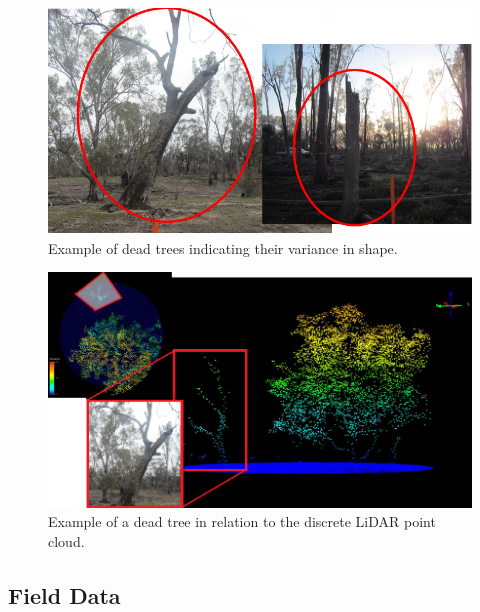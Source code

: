 \documentclass{subfiles}
\begin{document}
	\begin{figure} [h!]
		\centering
		\includegraphics[width=\textwidth]{img/DeadTreesExamplePhotos}
		\caption{Example of dead trees indicating their variance in shape.}
		\label{fig:DeadTreesExamplePhotos}
	\end{figure}

 \begin{figure} [h!]
 	\centering
 	\includegraphics[width=\textwidth]{img/DeadTreeInLiDAR}
 	\caption{Example of a dead tree in relation to the discrete LiDAR point cloud.}
 	\label{fig:DeadTreeInLiDAR}
 \end{figure}



\subsection{Field Data}
\end{document}
